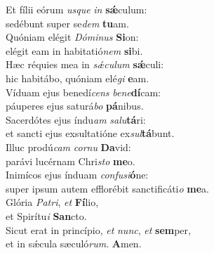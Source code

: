 \oddverse Et fílii eórum \textit{us}\textit{que} \textit{in} \textbf{sǽ}culum:~\*\\
\oddverse sedébunt super se\textit{dem} \textbf{tu}am.\\
\evenverse Quóniam elégit \textit{Dó}\textit{mi}\textit{nus} \textbf{Si}on:~\*\\
\evenverse elégit eam in habitatió\textit{nem} \textbf{si}bi.\\
\oddverse Hæc réquies mea in \textit{sǽ}\textit{cu}\textit{lum} \textbf{sǽ}culi:~\*\\
\oddverse hic habitábo, quóniam elé\textit{gi} \textbf{e}am.\\
\evenverse Víduam ejus benedí\textit{cens} \textit{be}\textit{ne}\textbf{dí}cam:~\*\\
\evenverse páuperes ejus saturá\textit{bo} \textbf{pá}nibus.\\
\oddverse Sacerdótes ejus índu\textit{am} \textit{sa}\textit{lu}\textbf{tá}ri:~\*\\
\oddverse et sancti ejus exsultatióne ex\textit{sul}\textbf{tá}bunt.\\
\evenverse Illuc prodú\textit{cam} \textit{cor}\textit{nu} \textbf{Da}vid:~\*\\
\evenverse parávi lucérnam Chri\textit{sto} \textbf{me}o.\\
\oddverse Inimícos ejus índuam \textit{con}\textit{fu}\textit{si}\textbf{ó}ne:~\*\\
\oddverse super ipsum autem efflorébit sanctificáti\textit{o} \textbf{me}a.\\
\evenverse Glória \textit{Pa}\textit{tri}, \textit{et} \textbf{Fí}lio,~\*\\
\evenverse et Spirítu\textit{i} \textbf{San}cto.\\
\oddverse Sicut erat in princípio, \textit{et} \textit{nunc}, \textit{et} \textbf{sem}per,~\*\\
\oddverse et in sǽcula sæculó\textit{rum}. \textbf{A}men.\\
